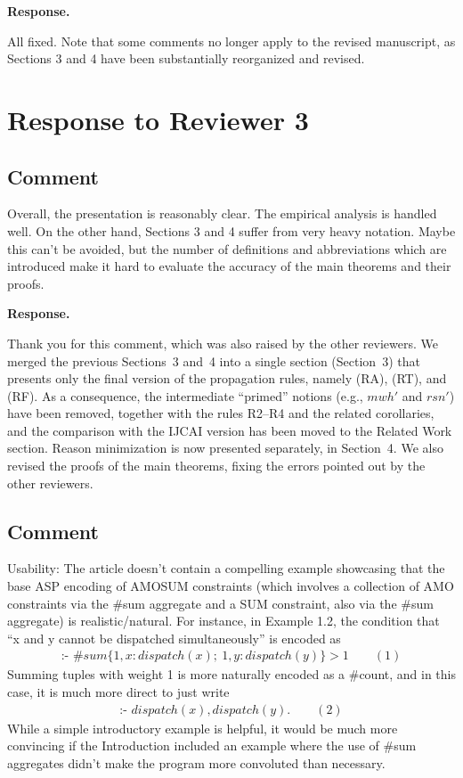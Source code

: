\documentclass[11pt]{article}
\newcommand{\mwh}{\mathit{mwh}}
\theoremstyle{definition}
\newcommand{\reviewertodo}{\subsection{\color{red}Comment}}
\newcommand{\revieweranswered}{\subsection{Comment}}
\newenvironment{response}{
    \color{blue} \textbf{Response.}
}{
}
\begin{document}
\begin{response}
    All fixed. Note that some comments no longer apply to the revised manuscript, as Sections 3 and 4 have been substantially reorganized and revised.
\end{response}

\section{Response to Reviewer 3}

\vspace{0.5cm}
\revieweranswered
Overall, the presentation is reasonably clear. The empirical analysis is handled well. On the other hand, Sections 3 and 4 suffer from very heavy notation. Maybe this can't be avoided, but the number of definitions and abbreviations which are introduced make it hard to evaluate the accuracy of the main theorems and their proofs.

\begin{response}
Thank you for this comment, which was also raised by the other reviewers.
We merged the previous Sections~3 and~4 into a single section (Section~3) that presents only the final version of the propagation rules, namely (RA), (RT), and (RF).
As a consequence, the intermediate ``primed'' notions (e.g., $\mwh'$ and $\mathit{rsn}'$) have been removed, together with the rules R2--R4 and the related corollaries, and the comparison with the IJCAI version has been moved to the Related Work section.
Reason minimization is now presented separately, in Section~4.
We also revised the proofs of the main theorems, fixing the errors pointed out by the other reviewers.
\end{response}

\vspace{0.5cm}
\reviewertodo
Usability: The article doesn't contain a compelling example showcasing that the base ASP encoding of AMOSUM constraints (which involves a collection of AMO constraints via the \#sum aggregate and a SUM constraint, also via the \#sum aggregate) is realistic/natural. For instance, in Example 1.2, the condition that ``x and y cannot be dispatched simultaneously'' is encoded as
\begin{align*}
    \text{:- } \#\mathit{sum}\{1,x : \mathit{dispatch}(x);\ 1,y : \mathit{dispatch}(y)\} > 1 \qquad (1)
\end{align*}
Summing tuples with weight 1 is more naturally encoded as a \#count, and in this case, it is much more direct to just write
\begin{align*}
    \text{:- } \mathit{dispatch}(x), \mathit{dispatch}(y). \qquad (2)
\end{align*}
While a simple introductory example is helpful, it would be much more convincing if the Introduction included an example where the use of \#sum aggregates didn't make the program more convoluted than necessary.
\end{document}
